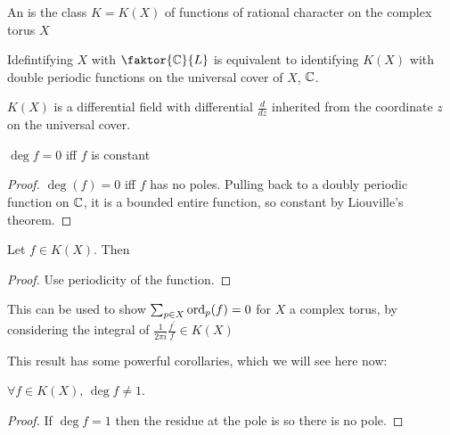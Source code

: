 \documentclass{article}
\begin{document}
\begin{definition}
	An  is the class $K =K(X)$ of functions of rational character on the complex torus $X$
\end{definition}

\begin{remark}
	Idefintifying $X$ with $\faktor{\mbb{C}}{L}$ is equivalent to identifying $K(X)$ with double periodic functions on the universal cover of $X$, $\mathbb{C}$.
\end{remark}

\begin{prop}
	$K(X)$ is a differential field with differential $\frac{d}{dz}$ inherited from the coordinate $z$ on the universal cover.  
\end{prop}

\begin{prop}
$\deg f = 0$ iff $f$ is constant
\end{prop}
\begin{proof}
	$\deg(f) = 0$ iff $f$ has no poles. Pulling back to a doubly periodic function on $\mathbb{C}$, it is a bounded entire function, so constant by Liouville's theorem. 
\end{proof}

\begin{lemma}
	Let $f \in K(X)$. Then 
\end{lemma}
\begin{proof}
	Use periodicity of the function. 
\end{proof}

\begin{remark}
	This can be used to show $\sum_{p\in X} \operatorname{ord}_p(f)=0$ for $X$ a complex torus, by considering the integral of $\frac{1}{2\pi i}\frac{f^\prime}{f} \in K(X)$
\end{remark}

This result has some powerful corollaries, which we will see here now:

\begin{prop}
	$\forall f \in K(X), \, \deg f \neq 1$.
\end{prop}
\begin{proof}
	If $\deg f = 1$ then the residue at the pole is 
so there is no pole. 
\end{proof}
\end{document}
